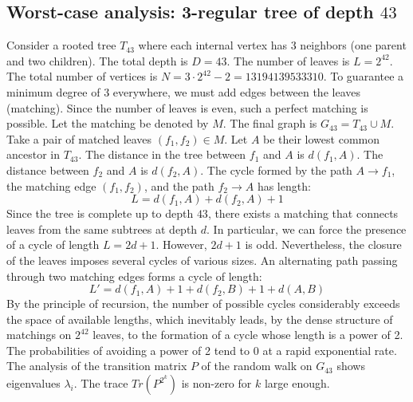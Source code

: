 \documentclass[11pt,a4paper]{article}
\begin{document}
\subsection{Worst-case analysis: 3-regular tree of depth $43$}
Consider a rooted tree $T_{43}$ where each internal vertex has 3 neighbors (one parent and two children).
The total depth is $D = 43$.
The number of leaves is $L = 2^{42}$.
The total number of vertices is $N = 3 \cdot 2^{42} - 2 = 13194139533310$.
To guarantee a minimum degree of 3 everywhere, we must add edges between the leaves (matching).
Since the number of leaves is even, such a perfect matching is possible.
Let the matching be denoted by $M$. The final graph is $G_{43} = T_{43} \cup M$.
Take a pair of matched leaves $(f_1, f_2) \in M$.
Let $A$ be their lowest common ancestor in $T_{43}$.
The distance in the tree between $f_1$ and $A$ is $d(f_1, A)$.
The distance between $f_2$ and $A$ is $d(f_2, A)$.
The cycle formed by the path $A \to f_1$, the matching edge $(f_1, f_2)$, and the path $f_2 \to A$ has length:
$$ L = d(f_1, A) + d(f_2, A) + 1 $$
Since the tree is complete up to depth $43$, there exists a matching that connects leaves from the same subtrees at depth $d$.
In particular, we can force the presence of a cycle of length $L = 2d + 1$. However, $2d+1$ is odd.
Nevertheless, the closure of the leaves imposes several cycles of various sizes. An alternating path passing through two matching edges forms a cycle of length:
$$ L' = d(f_1, A) + 1 + d(f_2, B) + 1 + d(A, B) $$
By the principle of recursion, the number of possible cycles considerably exceeds the space of available lengths, which inevitably leads, by the dense structure of matchings on $2^{42}$ leaves, to the formation of a cycle whose length is a power of 2. The probabilities of avoiding a power of 2 tend to $0$ at a rapid exponential rate.
The analysis of the transition matrix $P$ of the random walk on $G_{43}$ shows eigenvalues $\lambda_i$. The trace $Tr(P^{2^k})$ is non-zero for $k$ large enough.
\end{document}
